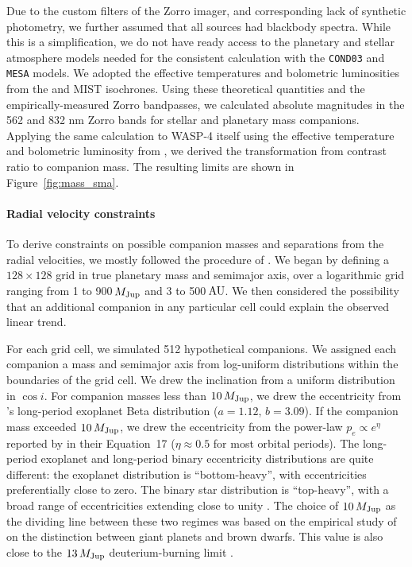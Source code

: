 \documentclass[12pt,twocolumn,tighten]{aastex62}
\begin{document}
Due to the custom filters of the Zorro imager, and corresponding lack
of synthetic photometry, we further assumed that all sources had
blackbody spectra. While this is a simplification, we do not have
ready access to the planetary and stellar atmosphere models needed for
the consistent calculation with the \texttt{COND03} and \texttt{MESA}
models.  We adopted the effective temperatures and bolometric
luminosities from the \citet{baraffe_evolutionary_2003} and MIST
isochrones.  Using these theoretical quantities and the
empirically-measured Zorro bandpasses, we calculated absolute
magnitudes in the 562 and 832 nm Zorro bands for stellar and planetary
mass companions.  Applying the same calculation to WASP-4 itself using
the effective temperature and bolometric luminosity from
, we derived the transformation from
contrast ratio to companion mass.  The resulting limits are shown in
Figure~\ref{fig:mass_sma}.

\paragraph{Radial velocity constraints}

To derive constraints on possible companion masses and separations
from the radial velocities, we mostly followed the procedure of
\citet{bryan_excess_2019}. We began by defining a $128\times128$ grid
in true planetary mass and semimajor axis, over a logarithmic grid
ranging from 1 to 900$\,$$M_{\rm Jup}$ and 3 to 500$\,$${\rm AU}$.  We
then considered the possibility that an additional companion in any
particular cell could explain the observed linear trend.

For each grid cell, we simulated 512 hypothetical companions. We
assigned each companion a mass and semimajor axis from log-uniform
distributions within the boundaries of the grid cell. We drew the
inclination from a uniform distribution in $\cos i$.  For companion
masses less than $10\,M_{\rm Jup}$, we drew the eccentricity from
\citet{kipping_beta_2013}'s long-period exoplanet Beta distribution
($a=1.12$, $b=3.09$).  If the companion mass exceeded $10\,M_{\rm
Jup}$, we drew the eccentricity from the power-law $p_e \propto
e^\eta$ reported by \citet{moe_mind_2017} in their Equation~17 ($\eta
\approx 0.5$ for most orbital periods).  The long-period exoplanet and
long-period binary eccentricity distributions are quite different: the
exoplanet distribution is ``bottom-heavy'', with eccentricities
preferentially close to zero.  The binary star distribution is
``top-heavy'', with a broad range of eccentricities extending close to
unity \citep{moe_mind_2017,price-whelan_close_2020}.  The choice of
$10\,M_{\rm Jup}$ as the dividing line between these two regimes was
based on the empirical study of \citet{schlaufman_evidence_2018} on
the distinction between giant planets and brown dwarfs. This value is
also close to the $13\,M_{\rm Jup}$ deuterium-burning limit
\citep[{\it e.g.},][]{burrows_nongray_1997}.
\end{document}
